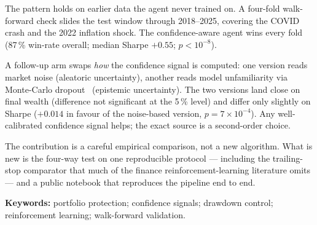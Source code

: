 The pattern holds on earlier data the agent never trained on. A four-fold walk-forward check slides the test window through 2018--2025, covering the COVID crash and the 2022 inflation shock. The confidence-aware agent wins every fold (87\,\% win-rate overall; median Sharpe $+0.55$; $p < 10^{-8}$).

A follow-up arm swaps \emph{how} the confidence signal is computed: one version reads market noise (aleatoric uncertainty), another reads model unfamiliarity via Monte-Carlo dropout~\parencite{gal2016dropout} (epistemic uncertainty). The two versions land close on final wealth (difference not significant at the 5\,\% level) and differ only slightly on Sharpe ($+0.014$ in favour of the noise-based version, $p = 7 \times 10^{-4}$). Any well-calibrated confidence signal helps; the exact source is a second-order choice.

The contribution is a careful empirical comparison, not a new algorithm. What is new is the four-way test on one reproducible protocol --- including the trailing-stop comparator that much of the finance reinforcement-learning literature omits --- and a public notebook that reproduces the pipeline end to end.

\vspace{1em}
\noindent\textbf{Keywords:} portfolio protection; confidence signals; drawdown control; reinforcement learning; walk-forward validation.
